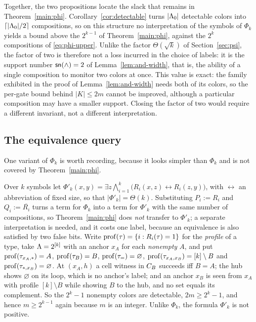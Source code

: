 Together, the two propositions locate the slack that remains in
Theorem~\ref{main:phi}. Corollary~\ref{cor:detectable} turns $|\Lambda_0|$
detectable colors into $\lceil|\Lambda_0|/2\rceil$ compositions, so on this
structure no interpretation of the symbols of $\Phi_k$ yields a bound above
the $2^{k-1}$ of Theorem~\ref{main:phi}, against the $2^k$ compositions of
\eqref{eq:phi-upper}. Unlike
the factor $\Theta(\sqrt k)$ of Section~\ref{sec:psi}, the factor of two is
therefore not a loss incurred in the choice of labels: it is the support
number $\mathsf{sn}(\land)=2$ of Lemma~\ref{lem:and-width}, that is, the ability of
a single composition to monitor two colors at once. This value is exact:
the family exhibited in the proof of Lemma~\ref{lem:and-width} needs both
of its colors, so the per-gate bound behind $|K|\le2m$ cannot be improved,
although a particular composition may have a smaller support. Closing the
factor of two would require a different invariant, not a different
interpretation.

\subsection{The equivalence query}\label{app:iff}
One variant of $\Phi_k$ is worth recording, because it looks simpler than
$\Phi_k$ and is not covered by Theorem~\ref{main:phi}.
\begin{remark}\label{rem:iff}
Over $k$ symbols let
$\Phi'_k(x,y)=\exists z\bigwedge_{i=1}^k\bigl(R_i(x,z)\leftrightarrow
R_i(z,y)\bigr)$, with $\leftrightarrow$ an abbreviation of fixed size, so
that $|\Phi'_k|=\Theta(k)$. Substituting $P_i:=R_i$ and
$Q_i:=\overline{R_i}$ turns a term for $\Phi_k$ into a term for $\Phi'_k$
with the same number of compositions, so Theorem~\ref{main:phi} does
\emph{not} transfer to $\Phi'_k$; a separate interpretation is needed, and
it costs one label, because an equivalence is also satisfied by two false
bits. Write $\operatorname{prof}(\tau)=\{i:R_i(\tau)=1\}$ for the \emph{profile} of a
type, take $\Lambda=2^{[k]}$ with an anchor $x_A$ for each \emph{nonempty} $A$,
and put $\operatorname{prof}(\tau_{x_A,\ast})=A$, $\operatorname{prof}(\tau_{B})=B$, $\operatorname{prof}(\tau_{=})=\varnothing$,
$\operatorname{prof}(\tau_{x_A,x_B})=[k]\setminus B$ and $\operatorname{prof}(\tau_{\ast,x_B})=\varnothing$.
At $(x_A,h)$ a cell witness in $C_{B}$ succeeds iff $B=A$; the hub shows
$\varnothing$ on its loop, which is no anchor's label; and an anchor $x_B$
is seen from $x_A$ with profile $[k]\setminus B$ while showing $B$ to the
hub, and no set equals its complement. So the $2^k-1$ nonempty colors are
detectable, $2m\ge2^k-1$, and hence $m\ge2^{k-1}$ again because $m$ is an
integer. Unlike $\Phi_k$, the
formula $\Phi'_k$ is not positive.
\end{remark}
